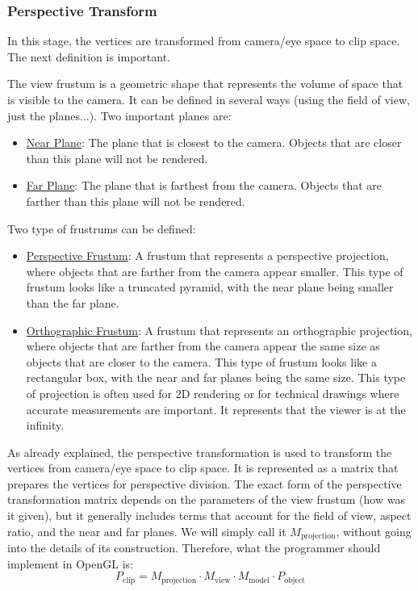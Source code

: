 \subsubsection{Perspective Transform}

In this stage, the vertices are transformed from camera/eye space to clip space. The next definition is important.
\begin{definicion}[Frustrum]
The view frustum is a geometric shape that represents the volume of space that is visible to the camera. It can be defined in several ways (using the field of view, just the planes...). Two important planes are:
\begin{itemize}
    \item \ul{Near Plane}: The plane that is closest to the camera. Objects that are closer than this plane will not be rendered.
    \item \ul{Far Plane}: The plane that is farthest from the camera. Objects that are farther than this plane will not be rendered.
\end{itemize}
\end{definicion}

Two type of frustrums can be defined:
\begin{itemize}
    \item \ul{Perspective Frustum}: A frustum that represents a perspective projection, where objects that are farther from the camera appear smaller. This type of frustum looks like a truncated pyramid, with the near plane being smaller than the far plane.
    \item \ul{Orthographic Frustum}: A frustum that represents an orthographic projection, where objects that are farther from the camera appear the same size as objects that are closer to the camera.
    This type of frustum looks like a rectangular box, with the near and far planes being the same size. This type of projection is often used for 2D rendering or for technical drawings where accurate measurements are important. It represents that the viewer is at the infinity.
\end{itemize}

As already explained, the perspective transformation is used to transform the vertices from camera/eye space to clip space. It is represented as a matrix that prepares the vertices for perspective division. The exact form of the perspective transformation matrix depends on the parameters of the view frustum (how was it given), but it generally includes terms that account for the field of view, aspect ratio, and the near and far planes. We will simply call it $M_{\text{projection}}$, without going into the details of its construction. Therefore, what the programmer should implement in OpenGL is:
\begin{equation*}
    P_{\text{clip}} = M_{\text{projection}}\cdot M_{\text{view}} \cdot M_{\text{model}} \cdot P_{\text{object}}
\end{equation*}

